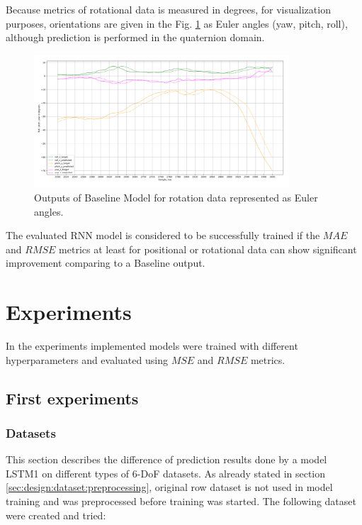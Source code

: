 Because metrics of rotational data is measured in degrees, for visualization purposes, orientations are given in the Fig. \ref{fig:base_euler} as Euler angles (yaw, pitch, roll), although prediction is performed in the quaternion domain.

\begin{figure}[htb]
	\begin{center}
		\includegraphics[width=0.85\textwidth, keepaspectratio]{gfx/base_euler-roll_pitch_yaw.png}
		\caption{\label{fig:base_euler} Outputs of Baseline Model for rotation data represented as Euler angles.}
	\end{center}
\end{figure}

The evaluated RNN model is considered to be successfully trained if the $MAE$ and $RMSE$ metrics at least for positional or rotational data can show significant improvement comparing to a Baseline output. 

\newpage
\section{Experiments}
\label{sec:eval:experiments}
In the experiments implemented models were trained with different hyperparameters and evaluated using $MSE$ and $RMSE$ metrics. 

\subsection{First experiments}
\label{sec:eval:experiments:early}

\subsubsection{Datasets}
\label{sec:eval:experiments:early:ds}
This section describes the difference of prediction results done by a model LSTM1 on different types of 6-DoF datasets. As already stated in section \ref{sec:design:dataset:preprocessing}, original row dataset is not used in model training and was preprocessed before training was started. The following dataset were created and tried:

